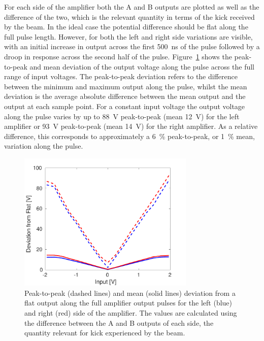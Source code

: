 For each side of the amplifier both the A and B outputs are plotted as well as the difference of the two, which is the relevant quantity in terms of the kick received by the beam. In the ideal case the potential difference should be flat along the full pulse length. However, for both the left and right side variations are visible, with an initial increase in output across the first 500~ns of the pulse followed by a droop in response across the second half of the pulse. Figure~\ref{f:ampFlatness} shows the peak-to-peak and mean deviation of the output voltage along the pulse across the full range of input voltages. The peak-to-peak deviation refers to the difference between the minimum and maximum output along the pulse, whilst the mean deviation is the average absolute difference between the mean output and the output at each sample point. For a constant input voltage the output voltage along the pulse varies by up to 88~V peak-to-peak (mean 12~V) for the left amplifier or 93~V peak-to-peak (mean 14~V) for the right amplifier. As a relative difference, this corresponds to approximately a 6~\% peak-to-peak, or 1~\% mean, variation along the pulse.

\begin{figure}
  \centering
  \includegraphics[width=0.75\textwidth]{Figures/commissioning/AmpFlatness}
  \caption{Peak-to-peak (dashed lines) and mean (solid lines) deviation from a flat output along the full amplifier output pulses for the left (blue) and right (red) side of the amplifier. The values are calculated using the difference between the A and B outputs of each side, the quantity relevant for kick experienced by the beam.}
  \label{f:ampFlatness}
\end{figure}

